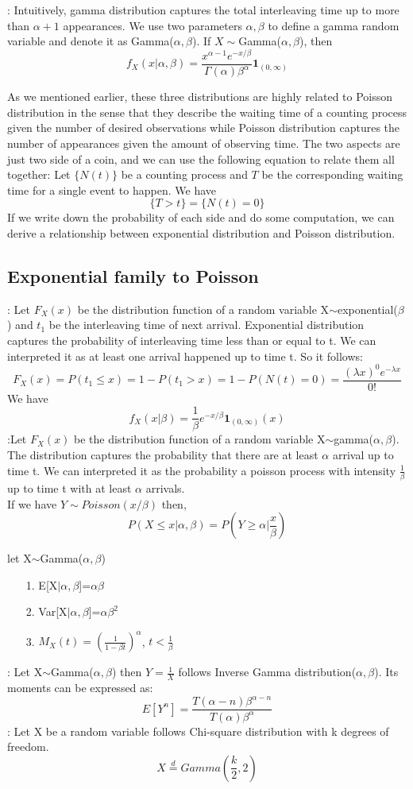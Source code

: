 \documentclass[../Distributions.tex]{subfiles}
\begin{document}
: Intuitively, gamma distribution captures the total interleaving time up to more than $\alpha+1$ appearances. We use two parameters $\alpha,\beta$ to define a gamma random variable and denote it as Gamma($\alpha,\beta$). If $X\sim$Gamma($\alpha,\beta$), then
$$f_X(x|\alpha,\beta) = \frac{x^{\alpha-1}e^{-x/\beta}}{\Gamma(\alpha)\beta^{\alpha}}\mathbf{1}_{(0,\infty)}$$

As we mentioned earlier, these three distributions are highly related to Poisson distribution in the sense that they describe the waiting time of a counting process given the number of desired observations while Poisson distribution captures the number of appearances given the amount of observing time. The two aspects are just two side of a coin, and we can use the following equation to relate them all together: Let $\{N(t)\}$ be a counting process and $T$ be the corresponding waiting time for a single event to happen. We have 
$$\{T>t\} = \{N(t)=0\}$$
If we write down the probability of each side and do some computation, we can derive a relationship between exponential distribution and Poisson distribution.
\subsection{Exponential family to Poisson}
: Let $F_X(x)$ be the distribution function of a random variable X$\sim$exponential($\beta$) and $t_1$ be the interleaving time of next arrival. Exponential distribution captures the probability of interleaving time less than or equal to t. We can interpreted it as at least one arrival happened up to time t. So it follows:
$$F_X(x)=P(t_1\leq x)=1-P(t_1>x)=1-P(N(t)=0)=\frac{(\lambda x)^0e^{-\lambda x}}{0!}$$
We have 
$$f_X(x|\beta) = \frac{1}{\beta}e^{-x/\beta}\mathbf{1}_{(0,\infty)}(x)$$
:Let $F_X(x)$ be the distribution function of a random variable X$\sim$gamma($\alpha,\beta$). The distribution captures the probability that there are at least $\alpha$ arrival up to time t. We can interpreted it as the probability a poisson process with intensity $\frac{1}{\beta}$ up to time t with at least $\alpha$ arrivals.\\ If we have $Y\sim Poisson(x/\beta)$ then,
$$P(X\leq x|\alpha,\beta)=P(Y\geq \alpha|\frac{x}{\beta})$$
\begin{property}let X$\sim$Gamma($\alpha,\beta$)
\begin{enumerate}
\item[1.] E[X$\vert\alpha,\beta$]=$\alpha\beta$
\item[2.] Var[X$\vert\alpha,\beta$]=$\alpha\beta^2$
\item[3.] $M_X(t)=(\frac{1}{1-\beta t})^\alpha$, $t<\frac{1}{\beta}$
\end{enumerate}
\end{property}
: Let X$\sim$Gamma($\alpha,\beta$) then $Y=\frac{1}{X}$ follows Inverse Gamma distribution($\alpha,\beta$).  Its moments can be expressed as:
$$E[Y^n]=\frac{T(\alpha-n)\beta^{\alpha-n}}{T(\alpha)\beta^\alpha}$$
: Let X be a random variable follows Chi-square distribution with k degrees of freedom.$$X\overset{d}{=}Gamma(\frac{k}{2},2)$$
\end{document}

